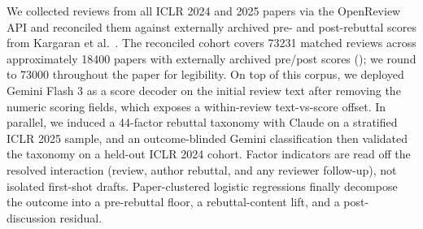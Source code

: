 \documentclass{article}
\begin{document}
We collected reviews from all ICLR 2024 and 2025 papers via the OpenReview API and reconciled them against externally archived pre- and post-rebuttal scores from Kargaran et al.~\cite{kargaran}. The reconciled cohort covers \num{73231} matched reviews across approximately \num{18400} papers with externally archived pre/post scores (); we round to \num{73000} throughout the paper for legibility. On top of this corpus, we deployed Gemini Flash 3 as a score decoder on the initial review text after removing the numeric scoring fields, which exposes a within-review text-vs-score offset. In parallel, we induced a 44-factor rebuttal taxonomy with Claude on a stratified ICLR 2025 sample, and an outcome-blinded Gemini classification then validated the taxonomy on a held-out ICLR 2024 cohort. Factor indicators are read off the resolved interaction (review, author rebuttal, and any reviewer follow-up), not isolated first-shot drafts. Paper-clustered logistic regressions finally decompose the outcome into a pre-rebuttal floor, a rebuttal-content lift, and a post-discussion residual.
\end{document}
